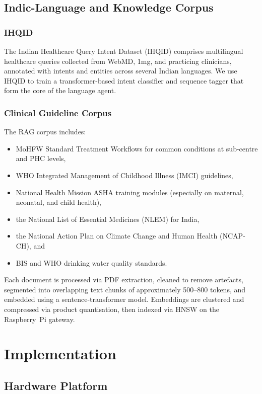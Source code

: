 \documentclass[conference]{IEEEtran}
\begin{document}
\subsection{Indic-Language and Knowledge Corpus}

\subsubsection{IHQID}
The Indian Healthcare Query Intent Dataset (IHQID) comprises multilingual healthcare queries collected from WebMD, 1mg, and practicing clinicians, annotated with intents and entities across several Indian languages. We use IHQID to train a transformer-based intent classifier and sequence tagger that form the core of the language agent.

\subsubsection{Clinical Guideline Corpus}
The RAG corpus includes:
\begin{itemize}
  \item MoHFW Standard Treatment Workflows for common conditions at sub-centre and PHC levels,
  \item WHO Integrated Management of Childhood Illness (IMCI) guidelines,
  \item National Health Mission ASHA training modules (especially on maternal, neonatal, and child health),
  \item the National List of Essential Medicines (NLEM) for India,
  \item the National Action Plan on Climate Change and Human Health (NCAP-CH), and
  \item BIS and WHO drinking water quality standards.
\end{itemize}

Each document is processed via PDF extraction, cleaned to remove artefacts, segmented into overlapping text chunks of approximately 500--800 tokens, and embedded using a sentence-transformer model. Embeddings are clustered and compressed via product quantisation, then indexed via HNSW on the Raspberry~Pi gateway.

\section{Implementation}

\subsection{Hardware Platform}
\end{document}
